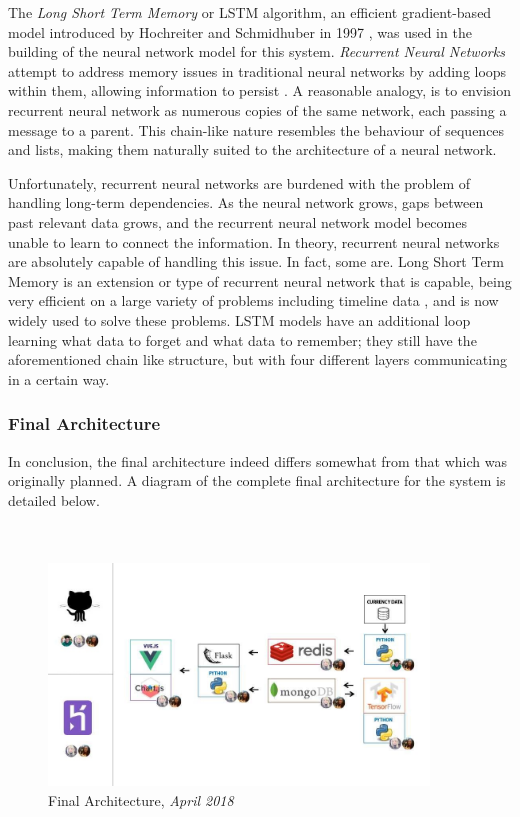 The \textit{Long Short Term Memory} or LSTM algorithm, an efficient gradient-based model introduced by Hochreiter and Schmidhuber in 1997 \cite{lstm}, was used in the building of the neural network model for this system. \textit{Recurrent Neural Networks} attempt to address memory issues in traditional neural networks by adding loops within them, allowing information to persist \cite{colah}. A reasonable analogy, is to envision recurrent neural network as numerous copies of the same network, each passing a message to a parent. This chain-like nature resembles the behaviour of sequences and lists, making them naturally suited to the architecture of a neural network. 

Unfortunately, recurrent neural networks are burdened with the problem of handling long-term dependencies. As the neural network grows, gaps between past relevant data grows, and the recurrent neural network model becomes unable to learn to connect the information. In theory, recurrent neural networks are absolutely capable of handling this issue. In fact, some are. Long Short Term Memory is an extension or type of recurrent neural network that is capable, being very efficient on a large variety of problems including timeline data \cite{dashee}, and is now widely used to solve these problems. LSTM models have an additional loop learning what data to forget and what data to remember; they still have the aforementioned chain like structure, but with four different layers communicating in a certain way.


\subsubsection{Final Architecture}

In conclusion, the final architecture indeed differs somewhat from that which was originally planned. A diagram of the complete final architecture for the system is detailed below.
\\
\\
\\
\begin{figure}[h]
    \centering
    \includegraphics[width=0.9\textwidth, keepaspectratio]{img/newarchitecture.jpg}
    \caption{Final Architecture, \textit{April 2018}}
    \label{finalarchitecture}
\end{figure}